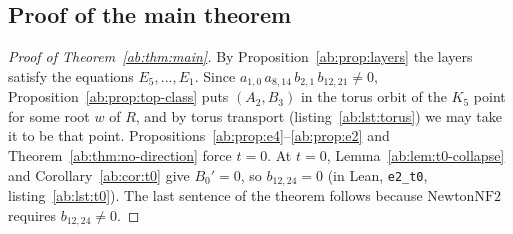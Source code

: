 \documentclass[a4paper,11pt]{article}
\theoremstyle{jsplain}
\theoremstyle{jsdef}
\theoremstyle{jsrem}
\begin{document}
\subsection{Proof of the main theorem}

\begin{proof}[Proof of Theorem~\ref{ab:thm:main}]
By Proposition~\ref{ab:prop:layers} the layers satisfy the equations $E_5,\dots,E_1$. Since $a_{1,0}\,a_{8,14}\,b_{2,1}\,b_{12,21}\neq 0$, Proposition~\ref{ab:prop:top-class} puts $(A_2,B_3)$ in the torus orbit of the $K_5$ point for some root $w$ of $R$, and by torus transport (listing~\ref{ab:lst:torus}) we may take it to be that point. Propositions~\ref{ab:prop:e4}--\ref{ab:prop:e2} and Theorem~\ref{ab:thm:no-direction} force $t=0$. At $t=0$, Lemma~\ref{ab:lem:t0-collapse} and Corollary~\ref{ab:cor:t0} give $B_0'=0$, so $b_{12,24}=0$ (in Lean, \texttt{e2\_\allowbreak{}t0}, listing~\ref{ab:lst:t0}). The last sentence of the theorem follows because $\mathrm{NewtonNF2}$ requires $b_{12,24}\neq 0$.
\end{proof}
\end{document}

